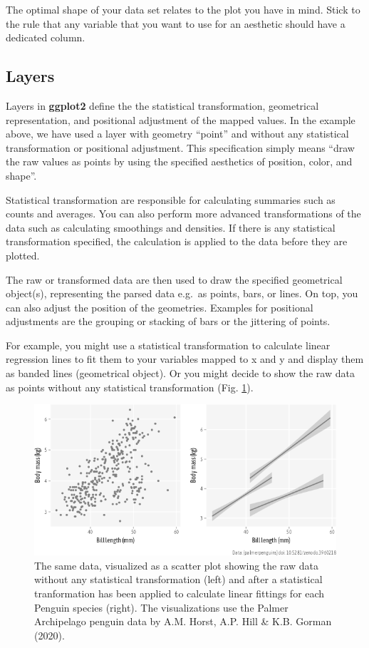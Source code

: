 \documentclass[
]{krantz}
\begin{document}
The optimal shape of your data set relates to the plot you have in mind. Stick to the rule that any variable that you want to use for an aesthetic should have a dedicated column.

\hypertarget{layers}{%
\subsection{Layers}\label{layers}}

Layers in \textbf{ggplot2} define the the statistical transformation, geometrical representation, and positional adjustment of the mapped values. In the example above, we have used a layer with geometry ``point'' and without any statistical transformation or positional adjustment. This specification simply means ``draw the raw values as points by using the specified aesthetics of position, color, and shape''.

Statistical transformation are responsible for calculating summaries such as counts and averages. You can also perform more advanced transformations of the data such as calculating smoothings and densities. If there is any statistical transformation specified, the calculation is applied to the data before they are plotted.

The raw or transformed data are then used to draw the specified geometrical object(s), representing the parsed data e.g.~as points, bars, or lines. On top, you can also adjust the position of the geometries. Examples for positional adjustments are the grouping or stacking of bars or the jittering of points.

For example, you might use a statistical transformation to calculate linear regression lines to fit them to your variables mapped to x and y and display them as banded lines (geometrical object). Or you might decide to show the raw data as points without any statistical transformation (Fig. \ref{fig:02ggplotLayersGeomsStats}).

\begin{figure}
\centering
\includegraphics{bookdown_files/figure-latex/02ggplotLayersGeomsStats-1.png}
\caption{\label{fig:02ggplotLayersGeomsStats}The same data, visualized as a scatter plot showing the raw data without any statistical transformation (left) and after a statistical tranformation has been applied to calculate linear fittings for each Penguin species (right). The visualizations use the Palmer Archipelago penguin data by A.M. Horst, A.P. Hill \& K.B. Gorman (2020).}
\end{figure}
\end{document}
